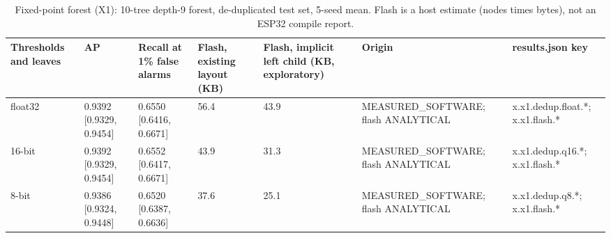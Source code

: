 \begin{table}[t]
\centering
\small
\caption{Fixed-point forest (X1): 10-tree depth-9 forest, de-duplicated test set, 5-seed mean. Flash is a host estimate (nodes times bytes), not an ESP32 compile report.}
\label{tab:jp_tab_x1}
\begin{tabular}{lllllll}
\toprule
Thresholds and leaves & AP & Recall at 1\% false alarms & Flash, existing layout (KB) & Flash, implicit left child (KB, exploratory) & Origin & results.json key \\
\midrule
float32 & 0.9392 [0.9329, 0.9454] & 0.6550 [0.6416, 0.6671] & 56.4 & 43.9 & MEASURED\_SOFTWARE; flash ANALYTICAL & x.x1.dedup.float.*; x.x1.flash.* \\
16-bit & 0.9392 [0.9329, 0.9454] & 0.6552 [0.6417, 0.6671] & 43.9 & 31.3 & MEASURED\_SOFTWARE; flash ANALYTICAL & x.x1.dedup.q16.*; x.x1.flash.* \\
8-bit & 0.9386 [0.9324, 0.9448] & 0.6520 [0.6387, 0.6636] & 37.6 & 25.1 & MEASURED\_SOFTWARE; flash ANALYTICAL & x.x1.dedup.q8.*; x.x1.flash.* \\
\bottomrule
\end{tabular}
\end{table}

